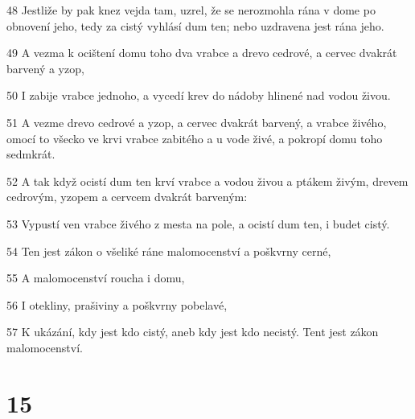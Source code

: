 \par 48 Jestliže by pak knez vejda tam, uzrel, že se nerozmohla rána v dome po obnovení jeho, tedy za cistý vyhlásí dum ten; nebo uzdravena jest rána jeho.
\par 49 A vezma k ocištení domu toho dva vrabce a drevo cedrové, a cervec dvakrát barvený a yzop,
\par 50 I zabije vrabce jednoho, a vycedí krev do nádoby hlinené nad vodou živou.
\par 51 A vezme drevo cedrové a yzop, a cervec dvakrát barvený, a vrabce živého, omocí to všecko ve krvi vrabce zabitého a u vode živé, a pokropí domu toho sedmkrát.
\par 52 A tak když ocistí dum ten krví vrabce a vodou živou a ptákem živým, drevem cedrovým, yzopem a cervcem dvakrát barveným:
\par 53 Vypustí ven vrabce živého z mesta na pole, a ocistí dum ten, i budet cistý.
\par 54 Ten jest zákon o všeliké ráne malomocenství a poškvrny cerné,
\par 55 A malomocenství roucha i domu,
\par 56 I otekliny, prašiviny a poškvrny pobelavé,
\par 57 K ukázání, kdy jest kdo cistý, aneb kdy jest kdo necistý. Tent jest zákon malomocenství.

\chapter{15}


